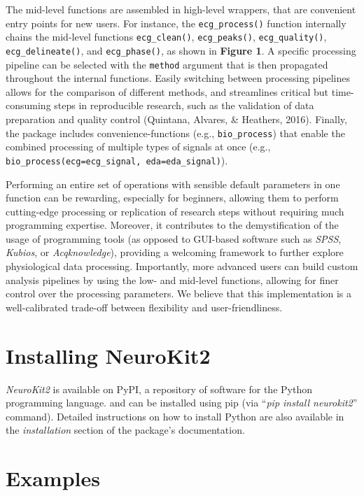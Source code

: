 \documentclass[
  english,
  man,floatsintext]{apa6}
\begin{document}
The mid-level functions are assembled in high-level wrappers, that are convenient entry points for new users. For instance, the \texttt{ecg\_process()} function internally chains the mid-level functions \texttt{ecg\_clean()}, \texttt{ecg\_peaks()}, \texttt{ecg\_quality()}, \texttt{ecg\_delineate()}, and \texttt{ecg\_phase()}, as shown in \textbf{Figure 1}. A specific processing pipeline can be selected with the \texttt{method} argument that is then propagated throughout the internal functions. Easily switching between processing pipelines allows for the comparison of different methods, and streamlines critical but time-consuming steps in reproducible research, such as the validation of data preparation and quality control (Quintana, Alvares, \& Heathers, 2016). Finally, the package includes convenience-functions (e.g., \texttt{bio\_process}) that enable the combined processing of multiple types of signals at once (e.g., \texttt{bio\_process(ecg=ecg\_signal,\ eda=eda\_signal)}).

Performing an entire set of operations with sensible default parameters in one function can be rewarding, especially for beginners, allowing them to perform cutting-edge processing or replication of research steps without requiring much programming expertise. Moreover, it contributes to the demystification of the usage of programming tools (as opposed to GUI-based software such as \emph{SPSS}, \emph{Kubios}, or \emph{Acqknowledge}), providing a welcoming framework to further explore physiological data processing. Importantly, more advanced users can build custom analysis pipelines by using the low- and mid-level functions, allowing for finer control over the processing parameters. We believe that this implementation is a well-calibrated trade-off between flexibility and user-friendliness.

\hypertarget{installing-neurokit2}{%
\section{Installing NeuroKit2}\label{installing-neurokit2}}

\emph{NeuroKit2} is available on PyPI, a repository of software for the Python programming language. and can be installed using pip (via \enquote{\emph{pip install neurokit2}} command). Detailed instructions on how to install Python are also available in the \emph{installation} section of the package's documentation.

\hypertarget{examples}{%
\section{Examples}\label{examples}}
\end{document}

